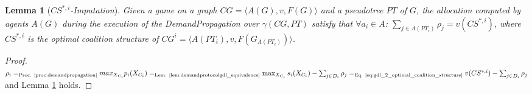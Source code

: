 \documentclass{aamas2012}
\newtheorem{lemma}{Lemma}
\newtheorem{observation}{Observation}
\begin{document}
%   

\begin{lemma}[\emph{$CS^{*,i}$-Imputation}]
Given a game on a graph $CG = \langle A(G), v, F(G)\rangle $ and a
pseudotree $PT$ of $G$, the allocation computed by agents $A(G)$
during the execution of the DemandPropagation 
over $\gamma(CG,PT)$ satisfy that $\forall a_i\in A$: $\sum_{j\in A(PT_i)}\rho_j =
v(CS^{*,i})$, where $CS^{*,i}$ is the optimal coalition structure of $CG^i=\langle A(PT_i), v,F(G_{
A(PT_i)})\rangle$.
\label{th:for_general_graphs_sum_of_payments}
\end{lemma}
\begin{proof}
$\rho_i =_{\text{Proc. \ref{proc:demandpropagation}}} max_{X_{C_i}}p_i(X_{C_i})
=_{\text{Lem. \ref{lem:demandprotocolgdl_equivalence}} }
\max_{X_{C_i}} s_i(X_{C_i}) -
\sum_{j\in D_i}\rho_j =_{\text{Eq.
\ref{eq:gdl_2_optimal_coalition_structure}} } v(CS^{*,i})  -
\sum_{j\in D_i}\rho_j$ and Lemma
\ref{th:for_general_graphs_sum_of_payments} holds.
\end{proof}
\end{document}
